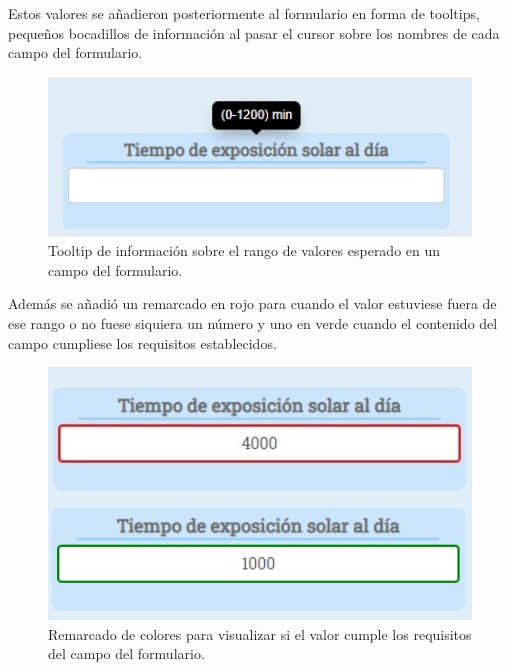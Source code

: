 Estos valores se añadieron posteriormente al formulario en forma de tooltips, pequeños bocadillos de información al pasar el cursor sobre los nombres de cada campo del formulario.

\begin{figure}[h]
    \centering
     \includegraphics[width=1\textwidth]{images/tooltip.jpg}
    \caption{Tooltip de información sobre el rango de valores esperado en un campo del formulario.}
\end{figure}

Además se añadió un remarcado en rojo para cuando el valor estuviese fuera de ese rango o no fuese siquiera un número y uno en verde cuando el contenido del campo cumpliese los requisitos establecidos.

\begin{figure}[h]
    \centering
     \includegraphics[width=1\textwidth]{images/remarcadoRojo.jpg}
    \caption{Remarcado de colores para visualizar si el valor cumple los requisitos del campo del formulario.}
\end{figure}